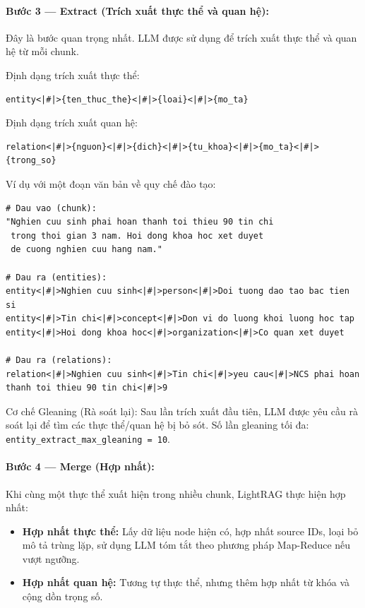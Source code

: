 \documentclass[12pt,a4paper]{article}
\begin{document}
\paragraph{Bước 3 --- Extract (Trích xuất thực thể và quan hệ):}
Đây là bước quan trọng nhất. LLM được sử dụng để trích xuất thực thể và quan hệ từ mỗi chunk.

Định dạng trích xuất thực thể:
\begin{lstlisting}[language=pseudo]
entity<|#|>{ten_thuc_the}<|#|>{loai}<|#|>{mo_ta}
\end{lstlisting}

Định dạng trích xuất quan hệ:
\begin{lstlisting}[language=pseudo]
relation<|#|>{nguon}<|#|>{dich}<|#|>{tu_khoa}<|#|>{mo_ta}<|#|>{trong_so}
\end{lstlisting}

Ví dụ với một đoạn văn bản về quy chế đào tạo:

\begin{lstlisting}[language=pseudo]
# Dau vao (chunk):
"Nghien cuu sinh phai hoan thanh toi thieu 90 tin chi
 trong thoi gian 3 nam. Hoi dong khoa hoc xet duyet
 de cuong nghien cuu hang nam."

# Dau ra (entities):
entity<|#|>Nghien cuu sinh<|#|>person<|#|>Doi tuong dao tao bac tien si
entity<|#|>Tin chi<|#|>concept<|#|>Don vi do luong khoi luong hoc tap
entity<|#|>Hoi dong khoa hoc<|#|>organization<|#|>Co quan xet duyet

# Dau ra (relations):
relation<|#|>Nghien cuu sinh<|#|>Tin chi<|#|>yeu cau<|#|>NCS phai hoan thanh toi thieu 90 tin chi<|#|>9
\end{lstlisting}

Cơ chế Gleaning (Rà soát lại): Sau lần trích xuất đầu tiên, LLM được yêu cầu rà soát lại để tìm các thực thể/quan hệ bị bỏ sót. Số lần gleaning tối đa: \texttt{entity\_extract\_max\_gleaning = 10}.

\paragraph{Bước 4 --- Merge (Hợp nhất):}
Khi cùng một thực thể xuất hiện trong nhiều chunk, LightRAG thực hiện hợp nhất:

\begin{itemize}
  \item \textbf{Hợp nhất thực thể:} Lấy dữ liệu node hiện có, hợp nhất source IDs, loại bỏ mô tả trùng lặp, sử dụng LLM tóm tắt theo phương pháp Map-Reduce nếu vượt ngưỡng.
  \item \textbf{Hợp nhất quan hệ:} Tương tự thực thể, nhưng thêm hợp nhất từ khóa và cộng dồn trọng số.
\end{itemize}
\end{document}

